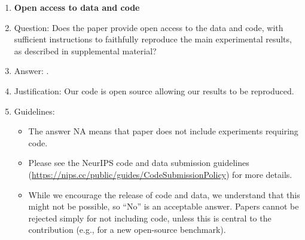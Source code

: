 \documentclass{article}
\begin{document}
\begin{enumerate}
\begin{itemize}
        \item While NeurIPS does not require releasing code, the conference does require all submissions to provide some reasonable avenue for reproducibility, which may depend on the nature of the contribution. For example
        \begin{enumerate}
            \item If the contribution is primarily a new algorithm, the paper should make it clear how to reproduce that algorithm.
            \item If the contribution is primarily a new model architecture, the paper should describe the architecture clearly and fully.
            \item If the contribution is a new model (e.g., a large language model), then there should either be a way to access this model for reproducing the results or a way to reproduce the model (e.g., with an open-source dataset or instructions for how to construct the dataset).
            \item We recognize that reproducibility may be tricky in some cases, in which case authors are welcome to describe the particular way they provide for reproducibility. In the case of closed-source models, it may be that access to the model is limited in some way (e.g., to registered users), but it should be possible for other researchers to have some path to reproducing or verifying the results.
        \end{enumerate}
    \end{itemize}
\item {\bf Open access to data and code}
    \item[] Question: Does the paper provide open access to the data and code, with sufficient instructions to faithfully reproduce the main experimental results, as described in supplemental material?
    \item[] Answer: \answerYes{}.
    \item[] Justification: Our code is open source allowing our results to be reproduced.
    \item[] Guidelines:
    \begin{itemize}
        \item The answer NA means that paper does not include experiments requiring code.
        \item Please see the NeurIPS code and data submission guidelines (\url{https://nips.cc/public/guides/CodeSubmissionPolicy}) for more details.
        \item While we encourage the release of code and data, we understand that this might not be possible, so “No” is an acceptable answer. Papers cannot be rejected simply for not including code, unless this is central to the contribution (e.g., for a new open-source benchmark).

\end{itemize}
\end{enumerate}
\end{document}

